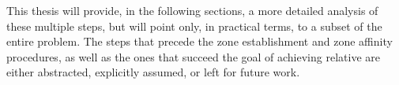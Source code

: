 This thesis will provide, in the following sections, a more detailed analysis of these multiple steps, but will point only, in practical terms, to a subset of the entire problem. The steps that precede the zone establishment and zone affinity procedures, as well as the ones that succeed the goal of achieving relative \pol{} are either abstracted, explicitly assumed, or left for future work.

